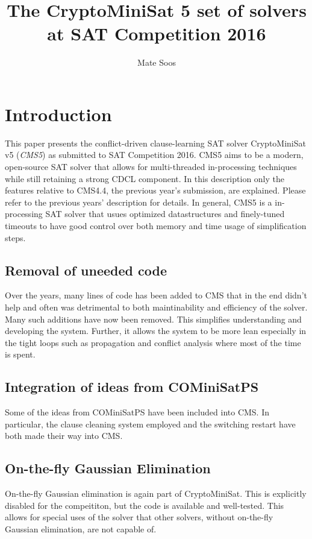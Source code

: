 \documentclass[final]{ieee}
\begin{document}
\title{The CryptoMiniSat 5 set of solvers at SAT Competition 2016}
\author{Mate Soos}

\maketitle
\thispagestyle{empty}
\pagestyle{empty}

\section{Introduction}
This paper presents the conflict-driven clause-learning SAT solver CryptoMiniSat v5 (\emph{CMS5}) as submitted to SAT Competition 2016. CMS5 aims to be a modern, open-source SAT solver that allows for multi-threaded in-processing techniques while still retaining a strong CDCL component. In this description only the features relative to CMS4.4, the previous year's submission, are explained. Please refer to the previous years' description for details. In general, CMS5 is a in-processing SAT solver that usues optimized datastructures and finely-tuned timeouts to have good control over both memory and time usage of simplification steps.

\subsection{Removal of uneeded code}
Over the years, many lines of code has been added to CMS that in the end didn't help and often was detrimental to both maintinability and efficiency of the solver. Many such additions have now been removed. This simplifies understanding and developing the system. Further, it allows the system to be more lean especially in the tight loops such as propagation and conflict analysis where most of the time is spent.

\subsection{Integration of ideas from COMiniSatPS}
Some of the ideas from COMiniSatPS\cite{swdia} have been included into CMS. In particular, the clause cleaning system employed and the switching restart have both made their way into CMS.

\subsection{On-the-fly Gaussian Elimination}
On-the-fly Gaussian elimination is again part of CryptoMiniSat. This is explicitly disabled for the compeititon, but the code is available and well-tested. This allows for special uses of the solver that other solvers, without on-the-fly Gaussian elimination, are not capable of.
\end{document}
